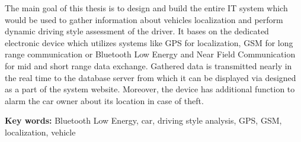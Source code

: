 \flushbottom


\begin{singlespacing}


The main goal of this thesis is to design and build the entire IT system which would be used to gather information about vehicles localization and perform dynamic driving style assessment of the driver. It bases on the dedicated electronic device which utilizes systems like GPS for localization, GSM for long range communication or Bluetooth Low Energy and Near Field Communication for mid and short range data exchange. Gathered data is transmitted nearly in the real time to the database server from which it can be displayed via designed as a part of the system website. Moreover, the device has additional function to alarm the car owner about its location in case of theft.

\flushbottom
\textbf{Key words: }Bluetooth Low Energy, car, driving style analysis, GPS, GSM, localization, vehicle
\end{singlespacing}
